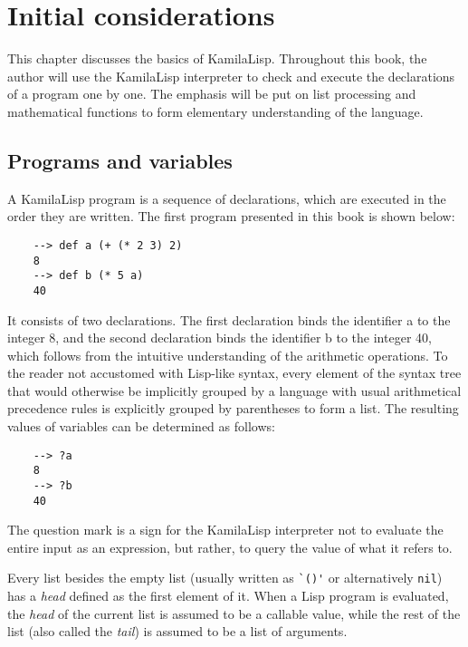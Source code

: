 
\chapter{Initial considerations}

This chapter discusses the basics of KamilaLisp. Throughout this book, the author will use the KamilaLisp interpreter to check and execute the declarations of a program one by one. The emphasis will be put on list processing and mathematical functions to form elementary understanding of the language.

\section{Programs and variables}

A KamilaLisp program is a sequence of declarations, which are executed in the order they are written. The first program presented in this book is shown below:

\begin{Verbatim}
    --> def a (+ (* 2 3) 2)
    8
    --> def b (* 5 a)
    40
\end{Verbatim}

It consists of two declarations. The first declaration binds the identifier a to the integer 8, and the second declaration binds the identifier b to the integer 40, which follows from the intuitive understanding of the arithmetic operations. To the reader not accustomed with Lisp-like syntax, every element of the syntax tree that would otherwise be implicitly grouped by a language with usual arithmetical precedence rules is explicitly grouped by parentheses to form a list. The resulting values of variables can be determined as follows:

\begin{Verbatim}
    --> ?a
    8
    --> ?b
    40
\end{Verbatim}

The question mark is a sign for the KamilaLisp interpreter not to evaluate the entire input as an expression, but rather, to query the value of what it refers to.

Every list besides the empty list (usually written as \verb|`()'| or alternatively \verb|nil|) has a \textit{head} defined as the first element of it. When a Lisp program is evaluated, the \textit{head} of the current list is assumed to be a callable value, while the rest of the list (also called the \textit{tail}) is assumed to be a list of arguments.


